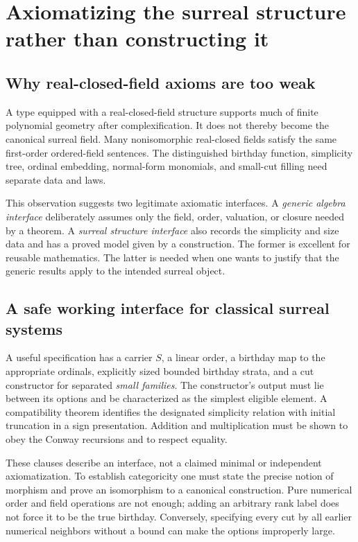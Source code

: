 \documentclass[11pt,letterpaper]{article}
\numberwithin{equation}{section}
\theoremstyle{definition}
\theoremstyle{remark}
\begin{document}
\section{Axiomatizing the surreal structure rather than constructing it}\label{sec:axiomatizations}

\subsection{Why real-closed-field axioms are too weak}
A type equipped with a real-closed-field structure supports much of finite polynomial geometry after complexification. It does not thereby become the canonical surreal field. Many nonisomorphic real-closed fields satisfy the same first-order ordered-field sentences. The distinguished birthday function, simplicity tree, ordinal embedding, normal-form monomials, and small-cut filling need separate data and laws.

This observation suggests two legitimate axiomatic interfaces. A \emph{generic algebra interface} deliberately assumes only the field, order, valuation, or closure needed by a theorem. A \emph{surreal structure interface} also records the simplicity and size data and has a proved model given by a construction. The former is excellent for reusable mathematics. The latter is needed when one wants to justify that the generic results apply to the intended surreal object.

\subsection{A safe working interface for classical surreal systems}
A useful specification has a carrier $S$, a linear order, a birthday map to the appropriate ordinals, explicitly sized bounded birthday strata, and a cut constructor for separated \emph{small families}. The constructor's output must lie between its options and be characterized as the simplest eligible element. A compatibility theorem identifies the designated simplicity relation with initial truncation in a sign presentation. Addition and multiplication must be shown to obey the Conway recursions and to respect equality.

These clauses describe an interface, not a claimed minimal or independent axiomatization. To establish categoricity one must state the precise notion of morphism and prove an isomorphism to a canonical construction. Pure numerical order and field operations are not enough; adding an arbitrary rank label does not force it to be the true birthday. Conversely, specifying every cut by all earlier numerical neighbors without a bound can make the options improperly large.
\end{document}
